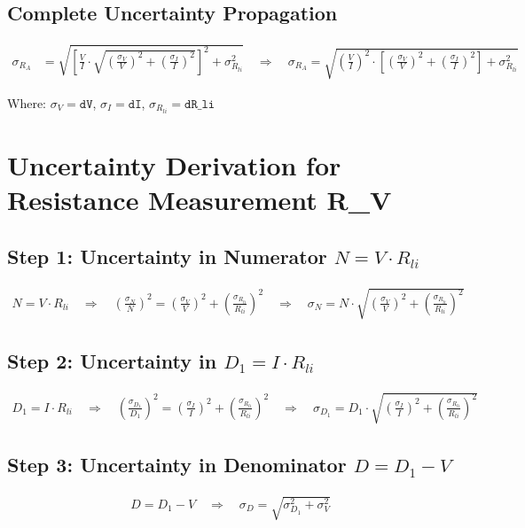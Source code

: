 \documentclass{article} %
\begin{document}
\subsection*{Complete Uncertainty Propagation}
\begin{align*}
\sigma_{R_A} &= \sqrt{\left[\frac{V}{I} \cdot \sqrt{\left(\frac{\sigma_V}{V}\right)^2 + \left(\frac{\sigma_I}{I}\right)^2}\right]^2 + \sigma_{R_{li}}^2} \quad \Rightarrow \quad \sigma_{R_A} = \sqrt{\left(\frac{V}{I}\right)^2 \cdot \left[\left(\frac{\sigma_V}{V}\right)^2 + \left(\frac{\sigma_I}{I}\right)^2\right] + \sigma_{R_{li}}^2}
\end{align*}

Where: $\sigma_V = \texttt{dV}$, $\sigma_I = \texttt{dI}$, $\sigma_{R_{li}} = \texttt{dR\_li}$


\newpage

\section{Uncertainty Derivation for Resistance Measurement R\_V}
\label{app:b_RV_uncertainty}

\subsection*{Step 1: Uncertainty in Numerator $N = V \cdot R_{li}$}
\begin{align*}
N = V \cdot R_{li} \quad \Rightarrow \quad \left(\frac{\sigma_N}{N}\right)^2 = \left(\frac{\sigma_V}{V}\right)^2 + \left(\frac{\sigma_{R_{li}}}{R_{li}}\right)^2 \quad \Rightarrow \quad \sigma_N = N \cdot \sqrt{\left(\frac{\sigma_V}{V}\right)^2 + \left(\frac{\sigma_{R_{li}}}{R_{li}}\right)^2}
\end{align*}

\subsection*{Step 2: Uncertainty in $D_1 = I \cdot R_{li}$}
\begin{align*}
D_1 = I \cdot R_{li} \quad \Rightarrow \quad \left(\frac{\sigma_{D_1}}{D_1}\right)^2 = \left(\frac{\sigma_I}{I}\right)^2 + \left(\frac{\sigma_{R_{li}}}{R_{li}}\right)^2 \quad \Rightarrow \quad \sigma_{D_1} = D_1 \cdot \sqrt{\left(\frac{\sigma_I}{I}\right)^2 + \left(\frac{\sigma_{R_{li}}}{R_{li}}\right)^2}
\end{align*}

\subsection*{Step 3: Uncertainty in Denominator $D = D_1 - V$}
\begin{align*}
D = D_1 - V \quad \Rightarrow \quad \sigma_D = \sqrt{\sigma_{D_1}^2 + \sigma_V^2}
\end{align*}
\end{document}
